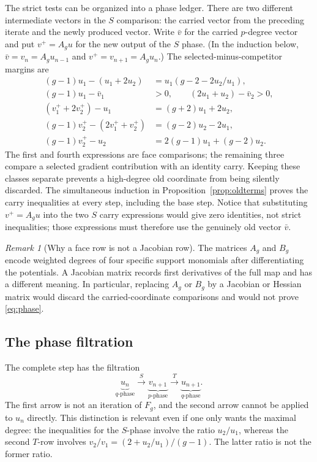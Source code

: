 \documentclass[11pt]{article}
\theoremstyle{remark}
\newtheorem{remark}[theorem]{Remark}
\numberwithin{equation}{section}
\begin{document}
The strict tests can be organized into a phase ledger.  There are two
different intermediate vectors in the $S$ comparison: the carried vector
from the preceding iterate and the newly produced vector.  Write
$\bar v$ for the carried $p$-degree vector and put $v^+=A_gu$ for the new
output of the $S$ phase.  (In the induction below,
$\bar v=v_n=A_gu_{n-1}$ and $v^+=v_{n+1}=A_gu_n$.)  The
selected-minus-competitor margins are
\begin{align}
 (g-1)u_1-(u_1+2u_2)&=u_1(g-2-2u_2/u_1),
 \label{eq:ledger-S-face}\\
 (g-1)u_1-\bar v_1&>0,\qquad
 (2u_1+u_2)-\bar v_2>0,\label{eq:ledger-S-carry}\\
 (v^+_1+2v^+_2)-u_1&=(g+2)u_1+2u_2,\label{eq:ledger-T-carry1}\\
 (g-1)v^+_2-(2v^+_1+v^+_2)&=(g-2)u_2-2u_1,\label{eq:ledger-T-face}\\
 (g-1)v^+_2-u_2&=2(g-1)u_1+(g-2)u_2.\label{eq:ledger-T-carry2}
\end{align}
The first and fourth expressions are face comparisons; the remaining three
compare a selected gradient contribution with an identity carry.  Keeping
these classes separate prevents a high-degree old coordinate from being
silently discarded.  The simultaneous induction in
Proposition~\ref{prop:oldterms} proves the carry inequalities at every step,
including the base step.  Notice that substituting $v^+=A_gu$ into the two
$S$ carry expressions would give zero identities, not strict inequalities;
those expressions must therefore use the genuinely old vector $\bar v$.

\begin{remark}[Why a face row is not a Jacobian row]
The matrices \(A_g\) and \(B_g\) encode weighted degrees of four specific
support monomials after differentiating the potentials.  A Jacobian matrix
records first derivatives of the full map and has a different meaning.  In
particular, replacing \(A_g\) or \(B_g\) by a Jacobian or Hessian matrix would
discard the carried-coordinate comparisons and would not prove
\eqref{eq:phase}.
\end{remark}

\subsection{The phase filtration}

The complete step has the filtration
\[
 \underbrace{u_n}_{q\text{-phase}}
 \xrightarrow{\ S\ }
 \underbrace{v_{n+1}}_{p\text{-phase}}
 \xrightarrow{\ T\ }
 \underbrace{u_{n+1}}_{q\text{-phase}}.
\]
The first arrow is not an iteration of \(F_g\), and the second arrow cannot be
applied to \(u_n\) directly.  This distinction is relevant even if one only
wants the maximal degree: the inequalities for the \(S\)-phase involve the
ratio \(u_2/u_1\), whereas the second \(T\)-row involves
\(v_2/v_1=(2+u_2/u_1)/(g-1)\).  The latter ratio is not the former ratio.
\end{document}
